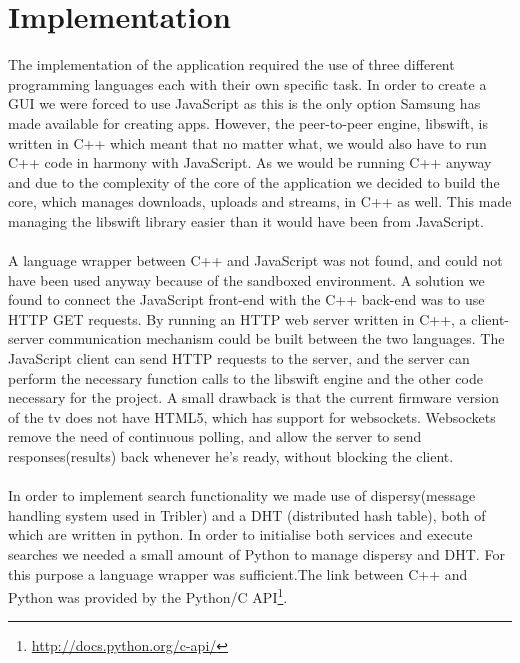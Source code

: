 \chapter{Implementation}

The implementation of the application required the use of three different programming languages each with their own specific task. In order to create a GUI we were forced to use JavaScript as this is the only option Samsung has made available for creating apps. However, the peer-to-peer engine, libswift, is written in C++ which meant that no matter what, we would also have to run C++ code in harmony with JavaScript. As we would be running C++ anyway and due to the complexity of the core of the application we decided to build the core, which manages downloads, uploads and streams, in C++ as well. This made managing the libswift library easier than it would have been from JavaScript.
\\\\
A language wrapper between C++ and JavaScript was not found, and could not have been used anyway because of the sandboxed environment. A solution we found to connect the JavaScript front-end with the C++ back-end was to use HTTP GET requests. By running an HTTP web server written in C++, a client-server communication mechanism could be built between the two languages. The JavaScript client can send HTTP requests to the server, and the server can perform the necessary function calls to the libswift engine and the other code necessary for the project. A small drawback is that the current firmware version of the tv does not have HTML5, which has support for websockets. Websockets remove the need of continuous polling, and allow the server to send responses(results) back whenever he's ready, without blocking the client. 
\\\\
In order to implement search functionality we made use of dispersy(message handling system used in Tribler) and a DHT (distributed hash table), both of which are written in python. In order to initialise both services and execute searches we needed a small amount of Python to manage dispersy and DHT. For this purpose a language wrapper was sufficient.The link between C++ and Python was provided by the Python/C API\footnote{\url{http://docs.python.org/c-api/}}.

